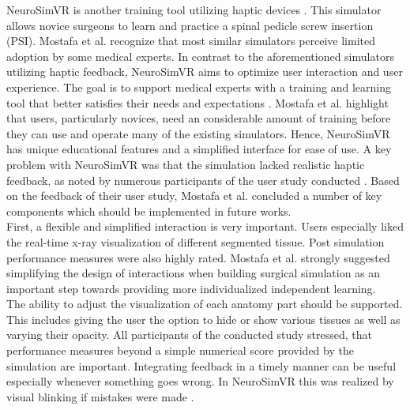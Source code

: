NeuroSimVR is another training tool utilizing haptic devices \cite{RN71}. This simulator allows
novice surgeons to learn and practice a spinal pedicle screw insertion (PSI). Mostafa
et al. \cite{RN71} recognize that most similar simulators perceive limited adoption by some medical
experts. In contrast to the aforementioned simulators utilizing haptic feedback, NeuroSimVR aims to optimize user interaction
and user experience. The goal is to support medical experts with a training and learning
tool that better satisfies their needs and expectations \cite{RN71}.
Mostafa et al. highlight that users, particularly novices, need an considerable amount
of training before they can use and operate many of the existing simulators. Hence,
NeuroSimVR has unique educational features and a simplified interface for ease of use.
A key problem with NeuroSimVR was that the simulation lacked realistic haptic feedback,
as noted by numerous participants of the user study conducted \cite{RN71}.
Based on the feedback of their user study, Mostafa et al. concluded a number of key components which should be implemented in future works.
\\ First, a flexible and simplified interaction is very important. Users especially liked the
real-time x-ray visualization of different segmented tissue. Post simulation performance
measures were also highly rated. Mostafa et al.
strongly suggested simplifying the design of interactions when building surgical simulation as an important step towards providing more individualized independent learning.
\\ The ability to adjust the visualization of each anatomy part should be supported. This
includes giving the user the option to hide or show various tissues as well as varying their
opacity. All participants of the conducted study stressed, that performance measures
beyond a simple numerical score provided by the simulation are important. Integrating
feedback in a timely manner can be useful especially whenever something goes wrong.
In NeuroSimVR this was realized by visual blinking if mistakes were made \cite{RN71}.